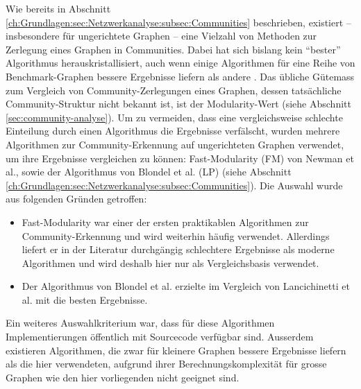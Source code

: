 Wie bereits in Abschnitt
\ref{ch:Grundlagen:sec:Netzwerkanalyse:subsec:Communities}
beschrieben, existiert -- insbesondere f\"ur ungerichtete Graphen --
eine Vielzahl von Methoden zur Zerlegung eines Graphen in
Communities. Dabei hat sich bislang kein ``bester'' Algorithmus
herauskristallisiert, auch wenn einige Algorithmen f\"ur eine Reihe
von Benchmark-Graphen bessere Ergebnisse liefern als andere
\cite{Lancichinetti2009}. Das \"ubliche G\"utemass zum Vergleich von
Community-Zerlegungen eines Graphen, dessen tats\"achliche
Community-Struktur nicht bekannt ist, ist der Modularity-Wert (siehe
Abschnitt \ref{sec:community-analyse}).  Um zu vermeiden, dass eine
vergleichsweise schlechte Einteilung durch einen Algorithmus die
Ergebnisse verf\"alscht, wurden mehrere Algorithmen zur
Community-Erkennung auf ungerichteten Graphen verwendet, um ihre
Ergebnisse vergleichen zu k\"onnen: Fast-Modularity (FM) von Newman et
al., sowie der Algorithmus von Blondel et al. (LP) (siehe Abschnitt
\ref{ch:Grundlagen:sec:Netzwerkanalyse:subsec:Communities}). Die
Auswahl wurde aus folgenden Gr\"unden getroffen:

\begin{itemize}
\item Fast-Modularity war einer der ersten praktikablen Algorithmen
  zur Community-Erkennung und wird weiterhin h\"aufig
  verwendet. Allerdings liefert er in der Literatur durchg\"angig
  schlechtere Ergebnisse als moderne Algorithmen \cite{Fortunato2010}
  und wird deshalb hier nur als Vergleichsbasis verwendet.
\item Der Algorithmus von Blondel et al. erzielte im Vergleich von
  Lancichinetti et al. \cite{Lancichinetti2009} mit die besten Ergebnisse.
\end{itemize}

Ein weiteres Auswahlkriterium war, dass f\"ur diese Algorithmen
Implementierungen \"offentlich mit Sourcecode verf\"ugbar
sind. Ausserdem existieren Algorithmen, die zwar f\"ur kleinere
Graphen bessere Ergebnisse liefern als die hier verwendeten, aufgrund
ihrer Berechnungskomplexit\"at f\"ur grosse Graphen wie den hier
vorliegenden nicht geeignet sind.

